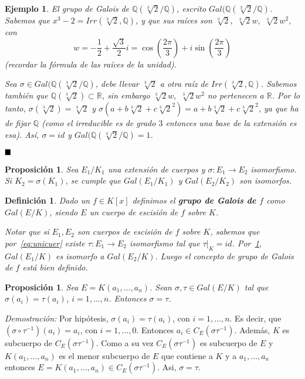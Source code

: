 \documentclass[12pt]{article}
\newtheorem{proposition}[theorem]{Proposición}
\newtheorem{definition}[theorem]{Definición}
\newtheorem{example}{Ejemplo}[theorem]
\begin{document}
\begin{example} El grupo de Galois de $\mathbb{Q}(\sqrt[3]{2}/\mathbb{Q})$, escrito $Gal(\mathbb{Q}(\sqrt[3]{2}/\mathbb{Q})$. Sabemos que $x^{3}-2 = Irr(\sqrt[3]{2}, \mathbb{Q})$, y que sus raíces son $\sqrt[3]{2},$  $\sqrt[3]{2}w,$  $\sqrt[3]{2}w^{2}$, con $$w = -\dfrac{1}{2} + \dfrac{\sqrt{3}}{2}i = \cos \left( \dfrac{2\pi}{3} \right) + i\sin \left( \dfrac{2\pi}{3} \right)$$ (recordar la fórmula de las raíces de la unidad).

Sea $\sigma \in Gal(\mathbb{Q}(\sqrt[3]{2}/\mathbb{Q})$, debe llevar $\sqrt[3]{2}$ a otra raíz de $Irr(\sqrt[3]{2}, \mathbb{Q})$. Sabemos también que $\mathbb{Q}(\sqrt[3]{2}) \subset \mathbb{R}$, sin embargo $\sqrt[3]{2}w,$  $\sqrt[3]{2}w^{2}$ no pertenecen a $\mathbb{R}$. Por lo tanto, $\sigma (\sqrt[3]{2}) = \sqrt[3]{2}$ y $\sigma (a + b\sqrt[3]{2} + c\sqrt[3]{2}^{2}) = a + b\sqrt[3]{2} + c\sqrt[3]{2}^{2}$, ya que ha de fijar $\mathbb{Q}$ (como el irreducible es de grado $3$ entonces una base de la extensión es esa). Así, $\sigma = id$ y $Gal(\mathbb{Q}(\sqrt[3]{2}/\mathbb{Q}) = 1$.
\end{example}

$\hfill \blacksquare$

\begin{proposition}\label{eq:ggal1} Sea $E_{1}/K_{1}$ una extensión de cuerpos y $\sigma \colon E_{1} \longrightarrow E_{2}$ isomorfismo. Si $K_{2} = \sigma (K_{1})$, se cumple que $Gal(E_{1}/K_{1})$ y $Gal(E_{2}/K_{2})$ son isomorfos.
\end{proposition}

\begin{definition} Dado un $f \in K[x]$ definimos el \textbf{grupo de Galois de $f$} como $Gal(E/K)$, siendo $E$ un cuerpo de escisión de $f$ sobre $K$.

Notar que si $E_{1}, E_{2}$ son cuerpos de escisión de $f$ sobre $K$, sabemos que por~\ref{eq:unicuer} existe $\tau \colon E_{1} \longrightarrow E_{2}$ isomorfismo tal que $\left.\tau \right|_K = id$. Por~\ref{eq:ggal1}, $Gal (E_{1}/K)$ es isomorfo a $Gal(E_{2}/K)$. Luego el concepto de grupo de Galois de $f$ está bien definido.
\end{definition}

\begin{proposition}\label{eq:gall} Sea $E = K(a_{1}, \ldots, a_{n})$. Sean $\sigma, \tau \in Gal(E/K)$ tal que $\sigma (a_{i}) = \tau (a_{i})$, $i = 1, \ldots, n$. Entonces $\sigma = \tau$.
\end{proposition}
\emph{Demostración: } 
Por hipótesis, $\sigma(a_{i}) = \tau (a_{i})$, con $i = 1, \ldots, n$. Es decir, que $(\sigma \circ \tau^{-1})(a_{i}) = a_{i}$, con $i = 1, \ldots, 0$. Entonces $a_{i}\in C_{E}(\sigma \tau^{-1})$. Además, $K$ es subcuerpo de $C_{E}(\sigma \tau^{-1})$. Como a su vez $C_{E}(\sigma \tau^{-1})$ es subcuerpo de $E$ y $K(a_{1}, \ldots, a_{n})$ es el menor subcuerpo de $E$ que contiene a $K$ y a $a_{1}, \ldots, a_{n}$ entonces $E = K(a_{1}, \ldots, a_{n}) \in C_{E}(\sigma \tau^{-1})$. Asi, $\sigma = \tau$.
\end{document}
